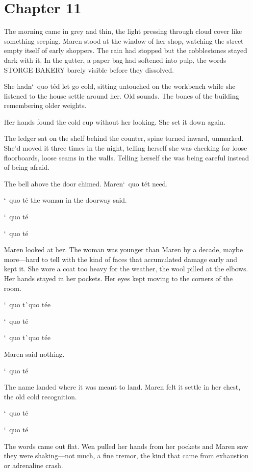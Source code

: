 \documentclass[12pt,letterpaper,openany]{book}
\begin{document}
\chapter{Chapter 11}
The morning came in grey and thin, the light pressing through cloud cover like something seeping. Maren stood at the window of her shop, watching the street empty itself of early shoppers. The rain had stopped but the cobblestones stayed dark with it. In the gutter, a paper bag had softened into pulp, the words STORGE BAKERY barely visible before they dissolved.
\par
She hadn`\ quo t\'e{}d let go cold, sitting untouched on the workbench while she listened to the house settle around her. Old sounds. The bones of the building remembering older weights.
\par
Her hands found the cold cup without her looking. She set it down again.
\par
The ledger sat on the shelf behind the counter, spine turned inward, unmarked. She'd moved it three times in the night, telling herself she was checking for loose floorboards, loose seams in the walls. Telling herself she was being careful instead of being afraid.
\par
The bell above the door chimed. Maren`\ quo t\'e{}t need.
\par
`\ quo t\'e{} the woman in the doorway said.
\par
`\ quo t\'e{}
\par
`\ quo t\'e{}
\par
Maren looked at her. The woman was younger than Maren by a decade, maybe more—hard to tell with the kind of faces that accumulated damage early and kept it. She wore a coat too heavy for the weather, the wool pilled at the elbows. Her hands stayed in her pockets. Her eyes kept moving to the corners of the room.
\par
`\ quo t\`\ quo t\'e{}e{}
\par
`\ quo t\'e{}
\par
`\ quo t\`\ quo t\'e{}e{}
\par
Maren said nothing.
\par
`\ quo t\'e{}
\par
The name landed where it was meant to land. Maren felt it settle in her chest, the old cold recognition.
\par
`\ quo t\'e{}
\par
`\ quo t\'e{}
\par
The words came out flat. Wen pulled her hands from her pockets and Maren saw they were shaking—not much, a fine tremor, the kind that came from exhaustion or adrenaline crash.
\end{document}
